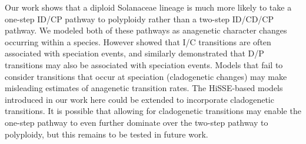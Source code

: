 
%
%

Our work shows that a diploid Solanaceae lineage is much more likely to take a
one-step ID/CP pathway to polyploidy rather than a two-step ID/CD/CP pathway. 
We modeled both of these pathways as anagenetic character changes occurring within a species.
However \citet{goldberg_2012} showed that I/C transitions are often associated with speciation events, and similarly \citet{freyman_2017} demonstrated that D/P transitions may also be associated with speciation events. 
Models that fail to consider transitions that occur at speciation (cladogenetic changes) may
make misleading estimates of anagenetic transition rates.
The HiSSE-based models introduced in our work here could be extended to incorporate cladogenetic transitions. 
It is possible that allowing for cladogenetic transitions may enable the one-step pathway
to even further dominate over the two-step pathway to polyploidy, but this remains to be tested in future work.


